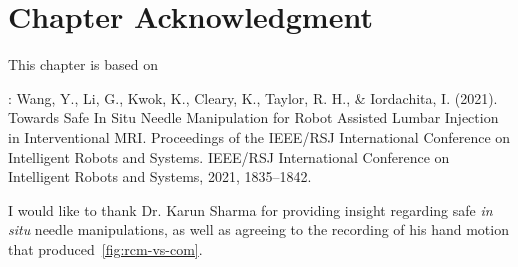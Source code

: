\section{Chapter Acknowledgment}
\label{sec:chap-2-ack}
This chapter is based on

\parencite{wangSafeSituNeedle2021}: Wang, Y., Li, G., Kwok, K., Cleary, K., Taylor, R. H., \& Iordachita, I. (2021). Towards Safe In Situ Needle Manipulation for Robot Assisted Lumbar Injection in Interventional MRI. Proceedings of the IEEE/RSJ International Conference on Intelligent Robots and Systems. IEEE/RSJ International Conference on Intelligent Robots and  Systems, 2021, 1835–1842.

I would like to thank Dr. Karun Sharma for providing insight regarding safe \textit{in situ} needle manipulations, as well as agreeing to the recording of his hand motion that produced~\cref{fig:rcm-vs-com}.

